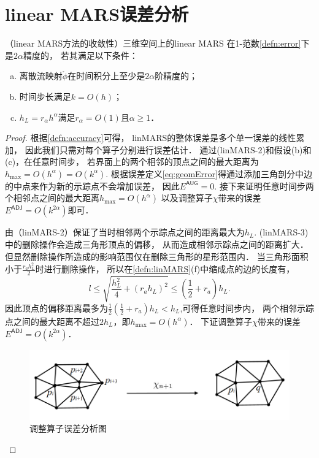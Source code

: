 \section{linear MARS误差分析}
\begin{prop}
	\label{prop:error}
	（linear MARS方法的收敛性）三维空间上的linear MARS
	   在1-范数\eqref{defn:error}下是$2\alpha$精度的，
	    若其满足以下条件：
	\begin{enumerate}[(a)]
		\item 离散流映射$\mathring{ \phi}$在时间积分上至少是$2\alpha$阶精度的；
		\item 时间步长满足$k=O(h)$；
		\item $h_L=r_{\alpha} h^{\alpha}$满足$r_{\alpha}=O(1)$且$\alpha\geq 1$．
	\end{enumerate}
\end{prop}
\begin{proof}	
	根据\eqref{defn:accuracy}可得，
	linMARS的整体误差是多个单一误差的线性累加，
	因此我们只需对每个算子分别进行误差估计．
	通过(linMARS-2)和假设(b)和(c)，在任意时间步，
	若界面上的两个相邻的顶点之间的最大距离为$h_{\mathrm{max}}=O(h^{\alpha})=O(k^{\alpha})$.
	根据误差定义\eqref{eq:geomError}得通过添加三角剖分中边的中点来作为新的示踪点不会增加误差，
	因此$E^{\textsf{AUG}}=0$.
	接下来证明任意时间步两个相邻点之间的最大距离$h_{\mathrm{max}}=O(h^{\alpha})$
	以及调整算子$\chi$带来的误差$E^{\textsf{ADJ}}=O(k^{2\alpha})$即可．
	
	
	由（linMARS-2）保证了当时相邻两个示踪点之间的距离最大为$h_L$. 
	(linMARS-3)中的删除操作会造成三角形顶点的偏移，
	从而造成相邻示踪点之间的距离扩大．
	但显然删除操作所造成的影响范围仅在删除三角形的星形范围内．
	当三角形面积小于$\frac{r_ah_L^2}{2}$时进行删除操作，
	所以在\ref{defn:linMARS}(f)中缩成点的边的长度有，
	\begin{equation*}
	l\leq\sqrt{\frac{h_L^2}{4}+(r_ah_L)^2}\leq(\frac{1}{2}+r_a)h_L.
	\end{equation*}
因此顶点的偏移距离最多为$\frac{1}{2}(\frac{1}{2}+r_a)h_L<h_L$,可得任意时间步内，
两个相邻示踪点之间的最大距离不超过$2h_L$，即$h_{\mathrm{max}}=O(h^{\alpha})$．
下证调整算子$\chi$带来的误差$E^{\textsf{ADJ}}=O(k^{2\alpha})$．

	 \begin{figure}[htbp]
		\label{fig:noDelete}
		\centering
			\includegraphics[width=0.7\linewidth]{images/error}
		\caption{调整算子误差分析图}
	\end{figure}
	

\end{proof}
